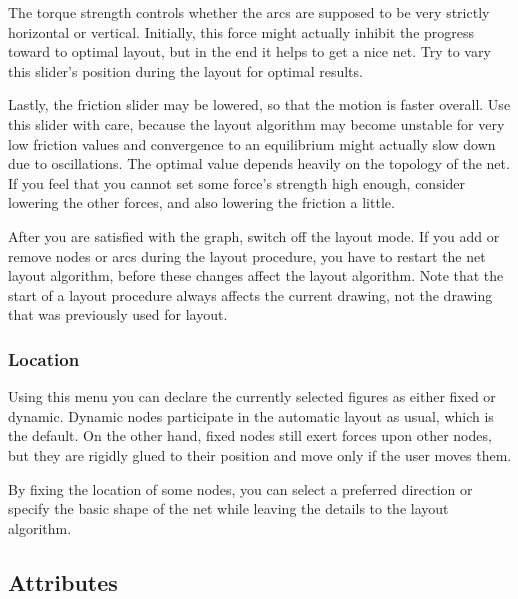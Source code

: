 The torque strength controls whether the arcs are supposed to be
very strictly horizontal or vertical. Initially, this force might
actually inhibit the progress toward to optimal layout, but in the
end it helps to get a nice net. Try to vary this slider's position
during the layout for optimal results.

Lastly, the friction slider may be lowered, so that the motion is
faster overall. Use this slider with care, because the layout
algorithm may become unstable for very low friction values and
convergence to an equilibrium might actually slow down due to
oscillations. The optimal value depends heavily on the topology of the net.
If you feel that you cannot set some force's strength high enough,
consider lowering the other forces, and also lowering the friction
a little.


After you are satisfied with the graph, switch off the layout mode.
If you add or remove nodes or arcs during the layout procedure,
you have to restart the net layout algorithm, before these changes
affect the layout algorithm. Note that the start of a layout procedure
always affects the current drawing, not the drawing that was previously
used for layout.

\subsubsection{Location}

Using this menu you can declare the currently selected
figures as either fixed or dynamic. Dynamic nodes participate in the
automatic layout as usual, which is the default.
On the other hand, fixed nodes still exert forces
upon other nodes, but they are rigidly glued to their position
and move only if the user moves them.

By fixing the location of some nodes, you can select a preferred
direction or specify the basic shape of the net while leaving the details
to the layout algorithm.


\subsection{Attributes}
\label{subsec:menuAttributes}

